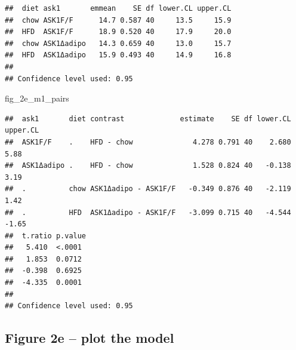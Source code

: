 \documentclass[]{book}
\newenvironment{Shaded}{\begin{snugshade}}{\end{snugshade}}
\newcommand{\NormalTok}[1]{#1}
\begin{document}
\begin{verbatim}
##  diet ask1       emmean    SE df lower.CL upper.CL
##  chow ASK1F/F      14.7 0.587 40     13.5     15.9
##  HFD  ASK1F/F      18.9 0.520 40     17.9     20.0
##  chow ASK1Δadipo   14.3 0.659 40     13.0     15.7
##  HFD  ASK1Δadipo   15.9 0.493 40     14.9     16.8
## 
## Confidence level used: 0.95
\end{verbatim}

\begin{Shaded}
\begin{Highlighting}[]
\NormalTok{fig_2e_m1_pairs}
\end{Highlighting}
\end{Shaded}

\begin{verbatim}
##  ask1       diet contrast             estimate    SE df lower.CL upper.CL
##  ASK1F/F    .    HFD - chow              4.278 0.791 40    2.680     5.88
##  ASK1Δadipo .    HFD - chow              1.528 0.824 40   -0.138     3.19
##  .          chow ASK1Δadipo - ASK1F/F   -0.349 0.876 40   -2.119     1.42
##  .          HFD  ASK1Δadipo - ASK1F/F   -3.099 0.715 40   -4.544    -1.65
##  t.ratio p.value
##   5.410  <.0001 
##   1.853  0.0712 
##  -0.398  0.6925 
##  -4.335  0.0001 
## 
## Confidence level used: 0.95
\end{verbatim}

\hypertarget{figure-2e-plot-the-model}{%
\subsection{Figure 2e -- plot the model}\label{figure-2e-plot-the-model}}
\end{document}

